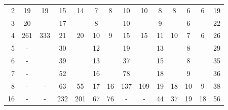 \documentclass[smallcondensed,final]{svjour3}     %
\begin{document}
\begin{table}
\begin{tabular}{|r|c c|c c|c c||c c|c c|c c||c|}
					2 & 19 & 19 & 15 & 14 & 7 & 8 & 10 & 10 & 8 & 8 & 6 & 6 & 19 \\

					3 & 20 & & 17 & & 8 & & 10 & & 9 & & 6 & & 22  \\

					4 & 261 & 333 & 21 & 20 & 10 & 9 & 15 & 15 & 11 & 10 & 7 & 6 & 26  \\

					5 & - & & 30 & & 12 & & 19 & & 13 & & 8 & &  29  \\

					6 & - & & 39 & & 13 & & 37 & & 15 & & 8 & &  35  \\

					7 & - & & 52 & & 16 & & 78 & & 18 & & 9 & &  36  \\

					8 & - & - & 63 & 55   & 17 & 16 & 137 & 109 & 19 & 18 & 10 & 9  & 38 \\

				 16 & - & - & 232 & 201 & 67 & 76 &  -  &  -  & 44 & 37 & 19 & 18 & 56 \\

\hline

  \end{tabular}

\end{table}
\end{document}
